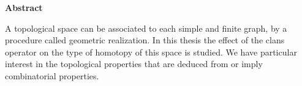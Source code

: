 \vspace{2cm}

\begin{flushleft}
  {\bfseries\Large Abstract}
\end{flushleft}

A topological space can be associated to each simple and finite graph, by a procedure called geometric realization. In this thesis the effect of the clans operator on the type of homotopy of this space is studied. We have particular interest in the topological properties that are deduced from or imply combinatorial properties.



 \newpage \thispagestyle{empty}